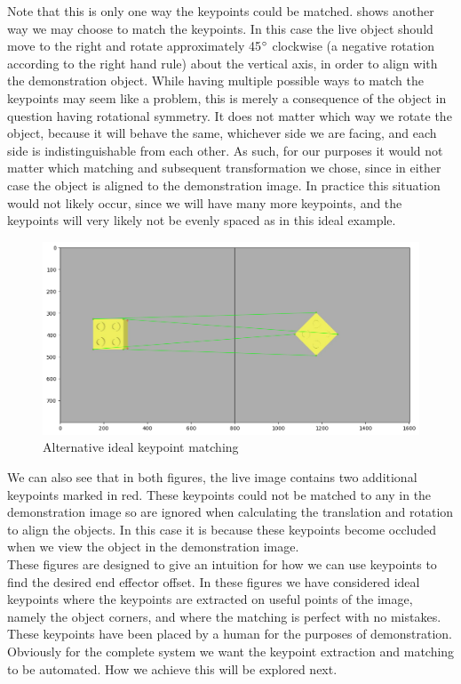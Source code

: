 Note that this is only one way the keypoints could be matched.  shows another way we may choose to match the keypoints. In this case the live object should move to the right and rotate approximately 45$\operatorname{^{\circ}}$ clockwise (a negative rotation according to the right hand rule) about the vertical axis, in order to align with the demonstration object. While having multiple possible ways to match the keypoints may seem like a problem, this is merely a consequence of the object in question having rotational symmetry. It does not matter which way we rotate the object, because it will behave the same, whichever side we are facing, and each side is indistinguishable from each other. As such, for our purposes it would not matter which matching and subsequent transformation we chose, since in either case the object is aligned to the demonstration image. In practice this situation would not likely occur, since we will have many more keypoints, and the keypoints will very likely not be evenly spaced as in this ideal example.

\begin{figure}[h]
    \centering
    \includegraphics[width=\textwidth]{figures/ideal_matches_inv.png}
    \caption{Alternative ideal keypoint matching}
    \label{fig:ideal-matches-inv}
\end{figure}

We can also see that in both figures, the live image contains two additional keypoints marked in red. These keypoints could not be matched to any in the demonstration image so are ignored when calculating the translation and rotation to align the objects. In this case it is because these keypoints become occluded when we view the object in the demonstration image.\\

These figures are designed to give an intuition for how we can use keypoints to find the desired end effector offset. In these figures we have considered ideal keypoints where the keypoints are extracted on useful points of the image, namely the object corners, and where the matching is perfect with no mistakes. These keypoints have been placed by a human for the purposes of demonstration. Obviously for the complete system we want the keypoint extraction and matching to be automated. How we achieve this will be explored next.


